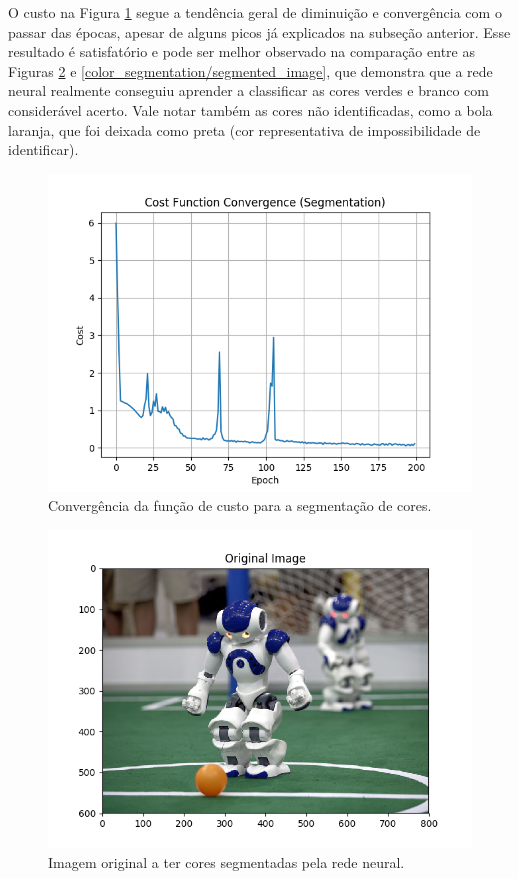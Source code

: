 \documentclass[conference]{IEEEtran}
\begin{document}
O custo na Figura \ref{color_segmentation/cost_function_convergence_segmentation} segue a tendência geral de diminuição e convergência com o passar das épocas, apesar de alguns picos já explicados na subseção anterior. Esse resultado é satisfatório e pode ser melhor observado na comparação entre as Figuras \ref{color_segmentation/original_image} e \ref{color_segmentation/segmented_image}, que demonstra que a rede neural realmente conseguiu aprender a classificar as cores verdes e branco com considerável acerto. Vale notar também as cores não identificadas, como a bola laranja, que foi deixada como preta (cor representativa de impossibilidade de identificar).

\begin{figure}[htbp]
\centering
\centerline{\includegraphics[scale=0.5]{imagens/color_segmentation/cost_function_convergence_segmentation.png}}
\caption{Convergência da função de custo para a segmentação de cores.}
\label{color_segmentation/cost_function_convergence_segmentation}
\end{figure}

\begin{figure}[htbp]
\centering
\centerline{\includegraphics[scale=0.5]{imagens/color_segmentation/original_image.png}}
\caption{Imagem original a ter cores segmentadas pela rede neural.}
\label{color_segmentation/original_image}
\end{figure}
\end{document}
